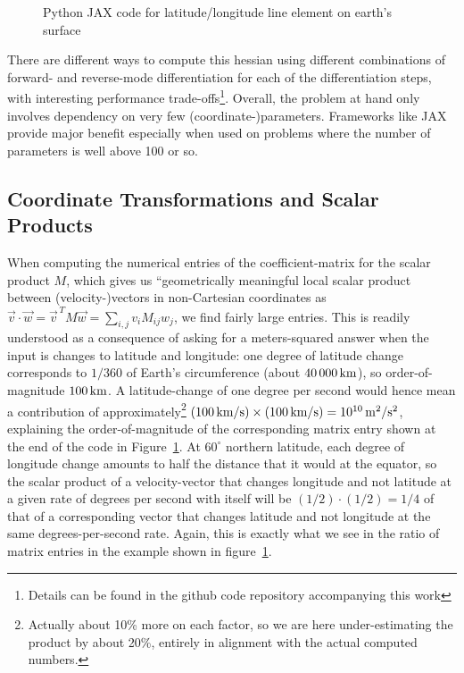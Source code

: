 \documentclass[twocolumn]{article}
\begin{document}
\begin{figure}[t]

\caption{Python JAX code for latitude/longitude line element on earth's surface}
\label{fig:jax_sphere}
\end{figure}

There are different ways to compute this hessian using different
combinations of forward- and reverse-mode differentiation for each of
the differentiation steps, with interesting performance
trade-offs\footnote{Details can be found in the github code repository
accompanying this work}. Overall, the problem at hand only involves
dependency on very few (coordinate-)parameters. Frameworks like JAX
provide major benefit especially when used on problems where the
number of parameters is well above 100 or so.

\subsection{Coordinate Transformations and Scalar Products}

When computing the numerical entries of the coefficient-matrix
for the scalar product \(M\), which gives us 
``geometrically meaningful local scalar product between
(velocity-)vectors in non-Cartesian coordinates as
\(\vec v\cdot\vec w = \vec v^{\,T} M \vec w = \sum_{i,j} v_i M_{ij} w_j\),
we find fairly large entries. This is
readily understood as a consequence of asking for a meters-squared
answer when the input is changes to latitude and longitude:
one degree of latitude change corresponds to
\(1/360\) of Earth's circumference (about \(40\,000\,{\rm km}\)), so
order-of-magnitude \(100\,{\rm km}\). A latitude-change of one degree
per second would hence mean a contribution of
approximately\footnote{Actually about 10\% more on each factor,
so we are here under-estimating the product by about 20\%,
entirely in alignment with the actual computed numbers.}
\((100\,{\rm km}/{\rm s})\times (100\,{\rm km}/{\rm s})=10^{10}\,{\rm m^2}/{\rm s^2}\),
explaining the order-of-magnitude of the corresponding matrix entry
shown at the end of the code in Figure~\ref{fig:jax_sphere}.  At
$60^\circ$ northern latitude, each degree of longitude change amounts
to half the distance that it would at the equator, so the scalar
product of a velocity-vector that changes longitude and not latitude
at a given rate of degrees per second with itself will be
$(1/2)\cdot(1/2)=1/4$ of that of a corresponding vector that changes
latitude and not longitude at the same degrees-per-second rate. Again,
this is exactly what we see in the ratio of matrix entries in the
example shown in figure~\ref{fig:jax_sphere}.
\end{document}
